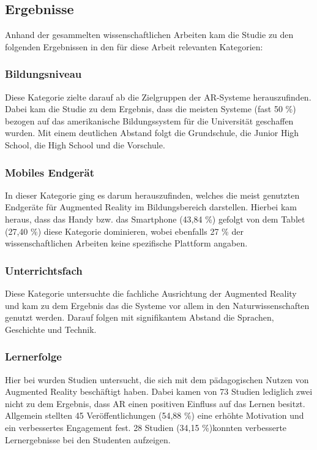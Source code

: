 \subsection{Ergebnisse}
Anhand der gesammelten wissenschaftlichen Arbeiten kam die Studie zu den folgenden Ergebnissen in den für diese Arbeit relevanten Kategorien:

\subsubsection{Bildungsniveau}
Diese Kategorie zielte darauf ab die Zielgruppen der AR-Systeme herauszufinden. Dabei kam die Studie zu dem Ergebnis, dass die meisten Systeme (fast 50 \%) bezogen auf das amerikanische Bildungssystem für die Universität geschaffen wurden. Mit einem deutlichen Abstand folgt die Grundschule, die Junior High School, die High School und die Vorschule. \citep[S. 78]{hedberg:review-ar-learning}

\subsubsection{Mobiles Endgerät}
In dieser Kategorie ging es darum herauszufinden, welches die meist genutzten Endgeräte für Augmented Reality im Bildungsbereich darstellen. Hierbei kam heraus, dass das Handy bzw. das Smartphone (43,84 \%) gefolgt von dem Tablet (27,40 \%) diese Kategorie dominieren, wobei ebenfalls 27 \% der wissenschaftlichen Arbeiten keine spezifische Plattform angaben. \citep[S. 80]{hedberg:review-ar-learning}

\subsubsection{Unterrichtsfach}
Diese Kategorie untersuchte die fachliche Ausrichtung der Augmented Reality und kam zu dem Ergebnis das die Systeme vor allem in den Naturwissenschaften genutzt werden. Darauf folgen mit signifikantem Abstand die Sprachen, Geschichte und Technik. \citep[S. 81]{hedberg:review-ar-learning}

\subsubsection{Lernerfolge}
Hier bei wurden Studien untersucht, die sich mit dem pädagogischen Nutzen von Augmented Reality beschäftigt haben. Dabei kamen von 73 Studien lediglich zwei nicht zu dem Ergebnis, dass AR einen positiven Einfluss auf das Lernen besitzt.\\
Allgemein stellten 45 Veröffentlichungen (54,88 \%) eine erhöhte Motivation und ein verbessertes Engagement fest. 28 Studien (34,15 \%)konnten verbesserte Lernergebnisse bei den Studenten aufzeigen.  \citep[S. 81-82]{hedberg:review-ar-learning}

